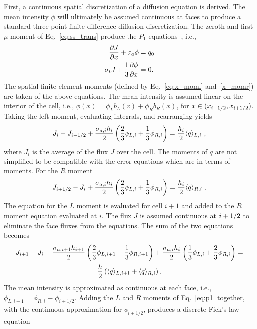 First, a continuous spatial discretization of a diffusion equation is derived.  
The mean intensity $\phi$ will ultimately be assumed continuous at faces to produce a
standard three-point finite-difference diffusion discretization. 
The zeroth and first $\mu$ moment of Eq.~\eqref{eq:ss_trans} produce the $P_1$
equations~\cite{lewis,wla_thesis}, i.e., 
\begin{align}\label{eq:dsa_bal}
    \frac{\partial J}{\partial x} + \sigma_a \phi &= q_0 \\ \label{eq:p1}
    \sigma_t J + \frac{1}{3} \frac{\partial \phi}{\partial x} &= 0.
\end{align}
The spatial finite element moments (defined by Eq.~\eqref{eq:x_moml} and~\eqref{x_momr})
are taken of the above equations. 
The mean intensity is assumed linear on the interior of the cell, i.e.,
$\phi(x)=\phi_Lb_L(x) + \phi_Rb_R(x)$, for $x\in({x_{i-1/2}},{x_{i+1/2}})$.   Taking the left moment,
evaluating integrals, and rearranging yields
\begin{equation}
    J_{i} - J_{{i-1/2}}  + \frac{\sigma_{a,i}h_i}{2} \left(\frac{2}{3} \phi_{L,i} + \frac{1}{3}
    \phi_{R,i} \right) = \frac{h_i}{2} \langle q \rangle_{L,i}\,\,,
\end{equation}
where $J_i$ is the average of the flux $J$ over the cell. The moments of $q$ are
not simplified to be compatible with the error equations which are in terms of moments. For the $R$ moment
\begin{equation}
    J_{i+1/2} - J_{i}  + \frac{\sigma_{a,i}h_i}{2} \left(\frac{2}{3} \phi_{L,i} + \frac{1}{3}
    \phi_{R,i} \right) = \frac{h_i}{2} \langle q \rangle_{R,i}\,\,.
\end{equation}
The equation for the $L$ moment is evaluated for cell $i+1$ and added to the $R$ moment
equation evaluated at $i$.  The flux $J$ is assumed continuous at ${i+1/2}$ to eliminate
the face fluxes from the equations.  The sum of the two equations becomes
\begin{multline}\label{eq:diff_noclose}
    J_{i+1} - J_{i} + \frac{\sigma_{a,i+1} h_{i+1}}{2}\left(\frac{2}{3} \phi_{L,i+1} +
    \frac{1}{3}\phi_{R,i+1}\right) + \frac{\sigma_{a,i} h_i}{2} \left( \frac{1}{3} \phi_{L,i} +
    \frac{2}{3}\phi_{R,i}\right) =\\ \frac{h}{2} \left(\langle q \rangle_{L,i+1} + \langle q \rangle_{R,i}
    \right).
\end{multline}
The mean intensity is approximated as continuous at each face, i.e., $\phi_{L,i+1} = \phi_{R,i}
\equiv \phi_{i+1/2}$.  Adding the $L$ and $R$ moments of Eq.~\eqref{eq:p1} together, with
the continuous approximation for $\phi_{i+1/2}$, produces a discrete Fick's law equation~\cite{stacy}
